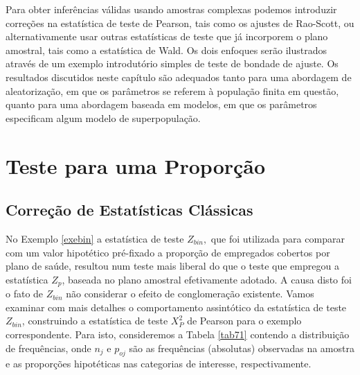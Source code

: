 \documentclass[]{book}
\numberwithin{example}{chapter}
\numberwithin{remark}{chapter}
\numberwithin{definition}{chapter}
\begin{document}
Para obter inferências válidas usando amostras complexas podemos
introduzir correções na estatística de teste de Pearson, tais como os
ajustes de Rao-Scott, ou alternativamente usar outras estatísticas de
teste que já incorporem o plano amostral, tais como a estatística de
Wald. Os dois enfoques serão ilustrados através de um exemplo
introdutório simples de teste de bondade de ajuste. Os resultados
discutidos neste capítulo são adequados tanto para uma abordagem de
aleatorização, em que os parâmetros se referem à população finita em
questão, quanto para uma abordagem baseada em modelos, em que os
parâmetros especificam algum modelo de superpopulação.

\section{Teste para uma Proporção}\label{teste-para-uma-proporcao}

\subsection{Correção de Estatísticas
Clássicas}\label{correcao-de-estatisticas-classicas}

No Exemplo \ref{exebin} a estatística de teste \(Z_{bin},\) que foi
utilizada para comparar com um valor hipotético pré-fixado a proporção
de empregados cobertos por plano de saúde, resultou num teste mais
liberal do que o teste que empregou a estatística \(Z_{p}\), baseada no
plano amostral efetivamente adotado. A causa disto foi o fato de
\(Z_{bin}\) não considerar o efeito de conglomeração existente. Vamos
examinar com mais detalhes o comportamento assintótico da estatística de
teste \(Z_{bin}\), construindo a estatística de teste \(X_{P}^{2}\) de
Pearson para o exemplo correspondente. Para isto, consideremos a Tabela
\ref{tab71} contendo a distribuição de frequências, onde \(n_{j}\) e
\(p_{oj}\) são as frequências (absolutas) observadas na amostra e as
proporções hipotéticas nas categorias de interesse, respectivamente.
\end{document}
